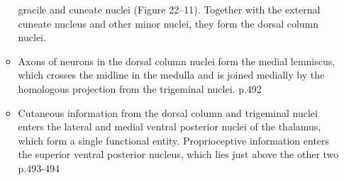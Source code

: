 \documentclass[12pt,a4paper,pdftex]{article}
\begin{document}
\begin{itemize}
\begin{itemize}
        gracile and cuneate nuclei (Figure 22–11). Together
        with the external cuneate nucleus and other minor
        nuclei, they form the dorsal column nuclei. \\ 
        \item Axons of neurons in the dorsal column nuclei form the medial lemniscus, which crosses the midline in the medulla and is joined medially by the homologous projection from the trigeminal nuclei. \cite{kandel2013principles} p.492
        \item Cutaneous information from the dorsal column
        and trigeminal nuclei enters the lateral and medial
        ventral posterior nuclei of the thalamus, which form
        a single functional entity. Proprioceptive information
        enters the superior ventral posterior nucleus, which
        lies just above the other two \cite{kandel2013principles} p.493-494
    \end{itemize}
    

\end{itemize}
\end{document}
